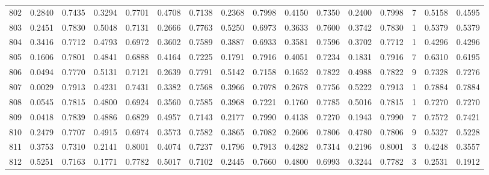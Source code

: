 \begin{tabular}{lrrrrrrrrrrrrrrr}
802 &      0.2840 &  0.7435 &  0.3294 &  0.7701 &  0.4708 &  0.7138 &  0.2368 &  0.7998 &  0.4150 &  0.7350 &   0.2400 &     0.7998 &      7 &                    0.5158 &                     0.4595 \\
803 &      0.2451 &  0.7830 &  0.5048 &  0.7131 &  0.2666 &  0.7763 &  0.5250 &  0.6973 &  0.3633 &  0.7600 &   0.3742 &     0.7830 &      1 &                    0.5379 &                     0.5379 \\
804 &      0.3416 &  0.7712 &  0.4793 &  0.6972 &  0.3602 &  0.7589 &  0.3887 &  0.6933 &  0.3581 &  0.7596 &   0.3702 &     0.7712 &      1 &                    0.4296 &                     0.4296 \\
805 &      0.1606 &  0.7801 &  0.4841 &  0.6888 &  0.4164 &  0.7225 &  0.1791 &  0.7916 &  0.4051 &  0.7234 &   0.1831 &     0.7916 &      7 &                    0.6310 &                     0.6195 \\
806 &      0.0494 &  0.7770 &  0.5131 &  0.7121 &  0.2639 &  0.7791 &  0.5142 &  0.7158 &  0.1652 &  0.7822 &   0.4988 &     0.7822 &      9 &                    0.7328 &                     0.7276 \\
807 &      0.0029 &  0.7913 &  0.4231 &  0.7431 &  0.3382 &  0.7568 &  0.3966 &  0.7078 &  0.2678 &  0.7756 &   0.5222 &     0.7913 &      1 &                    0.7884 &                     0.7884 \\
808 &      0.0545 &  0.7815 &  0.4800 &  0.6924 &  0.3560 &  0.7585 &  0.3968 &  0.7221 &  0.1760 &  0.7785 &   0.5016 &     0.7815 &      1 &                    0.7270 &                     0.7270 \\
809 &      0.0418 &  0.7839 &  0.4886 &  0.6829 &  0.4957 &  0.7143 &  0.2177 &  0.7990 &  0.4138 &  0.7270 &   0.1943 &     0.7990 &      7 &                    0.7572 &                     0.7421 \\
810 &      0.2479 &  0.7707 &  0.4915 &  0.6974 &  0.3573 &  0.7582 &  0.3865 &  0.7082 &  0.2606 &  0.7806 &   0.4780 &     0.7806 &      9 &                    0.5327 &                     0.5228 \\
811 &      0.3753 &  0.7310 &  0.2141 &  0.8001 &  0.4074 &  0.7237 &  0.1796 &  0.7913 &  0.4282 &  0.7314 &   0.2196 &     0.8001 &      3 &                    0.4248 &                     0.3557 \\
812 &      0.5251 &  0.7163 &  0.1771 &  0.7782 &  0.5017 &  0.7102 &  0.2445 &  0.7660 &  0.4800 &  0.6993 &   0.3244 &     0.7782 &      3 &                    0.2531 &                     0.1912 \\

\end{tabular}
